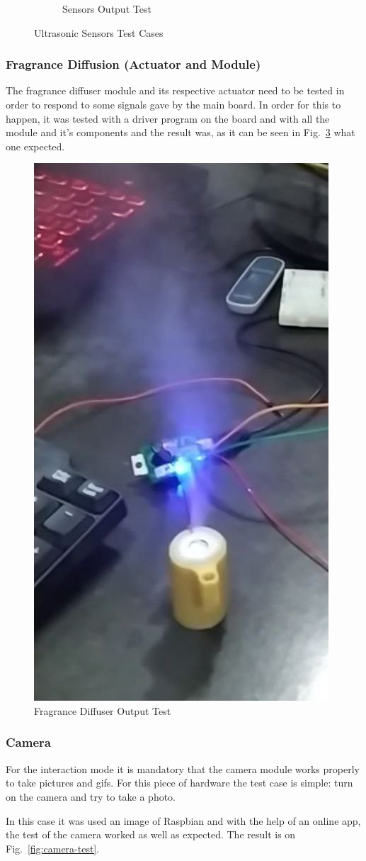 \begin{figure}[htb!]
\begin{subfigure}{.5\textwidth}
  \caption{Sensors Output Test}%
  \label{fig:sensors-out-test}
  \end{subfigure}
  \caption{Ultrasonic Sensors Test Cases}%
  \label{fig:uss-test}
\end{figure}

\subsubsection{Fragrance Diffusion (Actuator and Module)}
\label{sec:frag}

The fragrance diffuser module and its respective actuator need to be tested in order to respond to some signals gave by the main board.
In order for this to happen, it was tested with a driver program on the board and with all the module and it's components and the result was, as it can be seen in Fig.~\ref{fig:frag-test} what one expected.

\begin{figure}[!htb]
    \includegraphics[width=.3\textwidth]{img/frag-test.jpg}%
  \caption{Fragrance Diffuser Output Test}%
  \label{fig:frag-test}
  \end{figure}
  
  
\subsubsection{Camera}
\label{sec:camera-test}
  
For the interaction mode it is mandatory that the camera module works properly to take pictures and gifs.
For this piece of hardware the test case is simple: turn on the camera and try to take a photo.

In this case it was used an image of Raspbian and with the help of an online app, the test of the camera worked as well as expected.
The result is on Fig.~\ref{fig:camera-test}.

